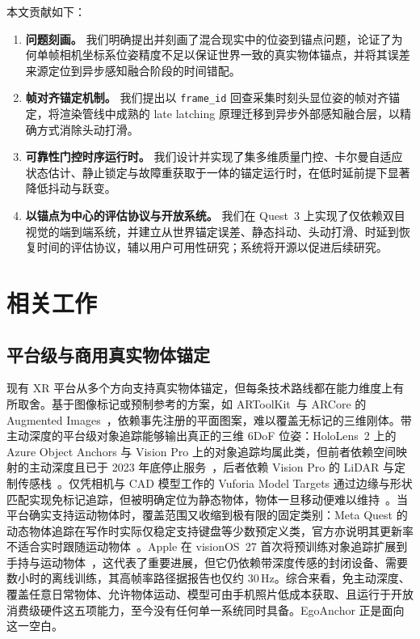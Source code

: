 \documentclass[review]{vgtc}
\begin{document}
本文贡献如下：
\begin{enumerate}[leftmargin=1.4em]
  \item \textbf{问题刻画。} 我们明确提出并刻画了混合现实中的位姿到锚点问题，论证了为何单帧相机坐标系位姿精度不足以保证世界一致的真实物体锚点，并将其误差来源定位到异步感知融合阶段的时间错配。
  \item \textbf{帧对齐锚定机制。} 我们提出以 \texttt{frame\_id} 回查采集时刻头显位姿的帧对齐锚定，将渲染管线中成熟的 late latching 原理迁移到异步外部感知融合层，以精确方式消除头动打滑。
  \item \textbf{可靠性门控时序运行时。} 我们设计并实现了集多维质量门控、卡尔曼自适应状态估计、静止锁定与故障重获取于一体的锚定运行时，在低时延前提下显著降低抖动与跃变。
  \item \textbf{以锚点为中心的评估协议与开放系统。} 我们在 Quest~3 上实现了仅依赖双目视觉的端到端系统，并建立从世界锚定误差、静态抖动、头动打滑、时延到恢复时间的评估协议，辅以用户可用性研究；系统将开源以促进后续研究。
\end{enumerate}


\section{相关工作}

\subsection{平台级与商用真实物体锚定}
现有 XR 平台从多个方向支持真实物体锚定，但每条技术路线都在能力维度上有所取舍。基于图像标记或预制参考的方案，如 ARToolKit~\cite{kato1999artoolkit}与 ARCore 的 Augmented Images~\cite{googleArcoreAugmentedImages}，依赖事先注册的平面图案，难以覆盖无标记的三维刚体。带主动深度的平台级对象追踪能够输出真正的三维 6DoF 位姿：HoloLens~2 上的 Azure Object Anchors 与 Vision Pro 上的对象追踪均属此类，但前者依赖空间映射的主动深度且已于 2023 年底停止服务~\cite{azureObjectAnchors}，后者依赖 Vision Pro 的 LiDAR 与定制传感栈~\cite{appleVisionOSObjectTracking}。仅凭相机与 CAD 模型工作的 Vuforia Model Targets 通过边缘与形状匹配实现免标记追踪，但被明确定位为静态物体，物体一旦移动便难以维持~\cite{vuforiaModelTargets}。当平台确实支持运动物体时，覆盖范围又收缩到极有限的固定类别：Meta Quest 的动态物体追踪在写作时实际仅稳定支持键盘等少数预定义类，官方亦说明其更新率不适合实时跟随运动物体~\cite{metaDynamicObjectTracker,metaSceneOverview}。Apple 在 visionOS~27 首次将预训练对象追踪扩展到手持与运动物体~\cite{appleVisionOS27ObjectTracking}，这代表了重要进展，但它仍依赖带深度传感的封闭设备、需要数小时的离线训练，其高帧率路径据报告也仅约 30\,Hz。综合来看，免主动深度、覆盖任意日常物体、允许物体运动、模型可由手机照片低成本获取、且运行于开放消费级硬件这五项能力，至今没有任何单一系统同时具备。EgoAnchor 正是面向这一空白。
\end{document}
